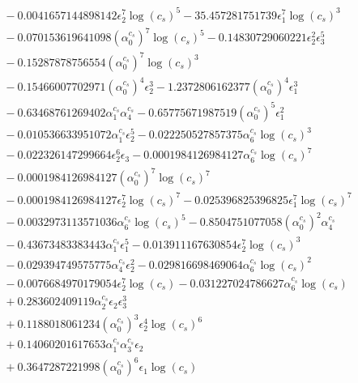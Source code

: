\documentclass[10pt]{article}
\begin{document}
\begin{align*}
&{}  - 0.0041657144898142 \epsilon_{2}^{7} \log{\left(c_{s} \right)}^{5} - 35.457281751739 \epsilon_{1}^{7} \log{\left(c_{s} \right)}^{3} \\
&{}  - 0.070153619641098 \left(\alpha_{0}^{c_s}\right)^{7} \log{\left(c_{s} \right)}^{5} - 0.14830729060221 \epsilon_{2}^{2} \epsilon_{3}^{5} \\
&{}  - 0.15287878756554 \left(\alpha_{0}^{c_s}\right)^{7} \log{\left(c_{s} \right)}^{3} \\
&{}  - 0.15466007702971 \left(\alpha_{0}^{c_s}\right)^{4} \epsilon_{2}^{3} - 1.2372806162377 \left(\alpha_{0}^{c_s}\right)^{4} \epsilon_{1}^{3} \\
&{}  - 0.63468761269402 \alpha_{1}^{c_s} \alpha_{4}^{c_s} - 0.65775671987519 \left(\alpha_{0}^{c_s}\right)^{5} \epsilon_{1}^{2} \\
&{}  - 0.010536633951072 \alpha_{1}^{c_s} \epsilon_{2}^{5} - 0.022250527857375 \alpha_{6}^{c_s} \log{\left(c_{s} \right)}^{3} \\
&{}  - 0.022326147299664 \epsilon_{2}^{6} \epsilon_{3} - 0.0001984126984127 \alpha_{6}^{c_s} \log{\left(c_{s} \right)}^{7} \\
&{}  - 0.0001984126984127 \left(\alpha_{0}^{c_s}\right)^{7} \log{\left(c_{s} \right)}^{7} \\
&{}  - 0.0001984126984127 \epsilon_{2}^{7} \log{\left(c_{s} \right)}^{7} - 0.025396825396825 \epsilon_{1}^{7} \log{\left(c_{s} \right)}^{7} \\
&{}  - 0.0032973113571036 \alpha_{6}^{c_s} \log{\left(c_{s} \right)}^{5} - 0.8504751077058 \left(\alpha_{0}^{c_s}\right)^{2} \alpha_{4}^{c_s} \\
&{}  - 0.43673483383443 \alpha_{1}^{c_s} \epsilon_{1}^{5} - 0.013911167630854 \epsilon_{2}^{7} \log{\left(c_{s} \right)}^{3} \\
&{}  - 0.029394749575775 \alpha_{4}^{c_s} \epsilon_{2}^{2} - 0.029816698469064 \alpha_{6}^{c_s} \log{\left(c_{s} \right)}^{2} \\
&{}  - 0.0076684970179054 \epsilon_{2}^{7} \log{\left(c_{s} \right)} - 0.031227024786627 \alpha_{6}^{c_s} \log{\left(c_{s} \right)} \\
&{}  + 0.283602409119 \alpha_{2}^{c_s} \epsilon_{2} \epsilon_{3}^{3} \\
&{}  + 0.1188018061234 \left(\alpha_{0}^{c_s}\right)^{3} \epsilon_{2}^{4} \log{\left(c_{s} \right)}^{6} \\
&{}  + 0.14060201617653 \alpha_{1}^{c_s} \alpha_{3}^{c_s} \epsilon_{2} \\
&{}  + 0.3647287221998 \left(\alpha_{0}^{c_s}\right)^{6} \epsilon_{1} \log{\left(c_{s} \right)} \\

\end{align*}
\end{document}
